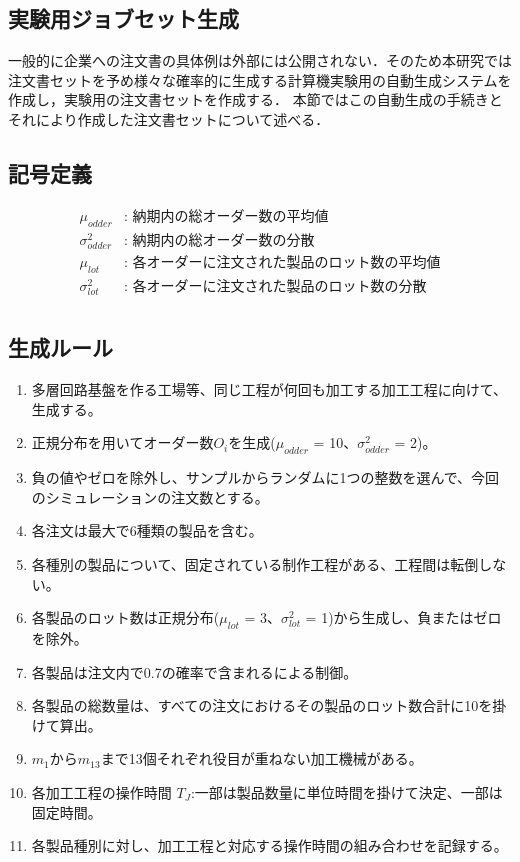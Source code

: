 \documentclass{jarticle}
\begin{document}
\subsection{実験用ジョブセット生成}
一般的に企業への注文書の具体例は外部には公開されない．そのため本研究では注文書セットを予め様々な確率的に生成する計算機実験用の自動生成システムを作成し，実験用の注文書セットを作成する．
本節ではこの自動生成の手続きとそれにより作成した注文書セットについて述べる．
\subsection{記号定義}
\begin{align}
    \mu_{odder} &\text{: 納期内の総オーダー数の平均値} \nonumber\\
    \sigma^2_{odder} &\text{: 納期内の総オーダー数の分散} \nonumber\\
    \mu_{lot} &\text{: 各オーダーに注文された製品のロット数の平均値} \nonumber\\
    \sigma^2_{lot} &\text{: 各オーダーに注文された製品のロット数の分散} \nonumber\\
\end{align}

\subsection{生成ルール}
\begin{enumerate}
    \item 多層回路基盤を作る工場等、同じ工程が何回も加工する加工工程に向けて、生成する。
    \item 正規分布を用いてオーダー数$O_{i}$を生成($\mu_{odder}$ = 10、$\sigma^2_{odder}$ = 2)。
    \item 負の値やゼロを除外し、サンプルからランダムに1つの整数を選んで、今回のシミュレーションの注文数とする。
    \item 各注文は最大で6種類の製品を含む。
    \item 各種別の製品について、固定されている制作工程がある、工程間は転倒しない。
    \item 各製品のロット数は正規分布($\mu_{lot}$ = 3、$\sigma^2_{lot}$ = 1)から生成し、負またはゼロを除外。
    \item 各製品は注文内で0.7の確率で含まれるによる制御。
    \item 各製品の総数量は、すべての注文におけるその製品のロット数合計に10を掛けて算出。
    \item $m_{1}$から$m_{13}$まで13個それぞれ役目が重ねない加工機械がある。
    \item 各加工工程の操作時間 $T_{J}$:一部は製品数量に単位時間を掛けて決定、一部は固定時間。
    \item 各製品種別に対し、加工工程と対応する操作時間の組み合わせを記録する。
    \end{enumerate}
\end{document}
